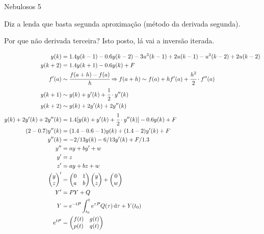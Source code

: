 \documentclass[12pt]{article}
\begin{document}
\Large

\begin{center}
Nebulosos 5
\end{center}

\normalsize

Diz a lenda que basta segunda aproxima\c{c}\~ao (m\'etodo da derivada segunda).

Por que n\~ao derivada terceira? Isto posto, l\'a vai a invers\~ao iterada.

\begin{align}
y(k) &= 1.4 y(k-1) - 0.6 y(k-2) - 3 u^3(k -1) + 2u(k-1) - u^3(k-2) + 2u(k-2) \\
y(k+2) &= 1.4y(k+1) - 0.6y(k) + F \\
f'(a) &\sim \cfrac{f(a + h) - f(a)}{h} \Rightarrow f(a + h) \sim f(a) + h f'(a) + \cfrac{h^2}{2}\cdot f''(a) \\
y(k + 1) &\sim y(k) + y'(k) + \cfrac{1}{2}\cdot y''(k) \\
y(k + 2) &\sim y(k) + 2 y'(k) + 2 y''(k) \\
y(k) + 2 y'(k) + 2 y''(k) &= 1.4 [y(k) + y'(k) + \cfrac{1}{2}\cdot y''(k)] - 0.6y(k) + F \\
(2 - 0.7) y''(k) &= (1.4 - 0.6 - 1) y(k) + (1.4 - 2) y'(k) + F \\
y''(k) &=  - 2/13 y(k) - 6/13 y'(k) + F/1.3 \\
y'' &=  a y + b y' + w \\
 y' &= z \\
 z' &= ay + bz + w \\
 \begin{pmatrix} y \\ z \end{pmatrix}' &= \begin{pmatrix} 0 & 1 \\ a & b \end{pmatrix}\begin{pmatrix} y \\ z \end{pmatrix} + \begin{pmatrix} 0 \\ w \end{pmatrix} \\
 Y' &= P Y + Q \\
 Y &= e^{-tP} \int_{t_0}^t e^{\tau P} Q(\tau)\, \mathrm{d}\tau + Y(t_0) \\
e^{tP} &= \begin{pmatrix} f(t) & g(t) \\ p(t) & q(t) \end{pmatrix} \\

\end{align}
\end{document}
